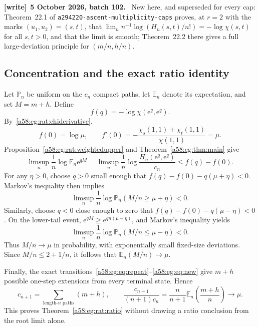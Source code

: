 \documentclass[11pt,letterpaper]{article}
\newcommand{\file}[1]{\nolinkurl{#1}}
\theoremstyle{remark}
\newcommand{\ee}{\mathrm e}
\newcommand{\muval}{\mu}
\newenvironment{writenote}[1][]{\par\smallskip\begingroup\small
 \noindent\textbf{[write]}\if\relax\detokenize{#1}\relax\else~\textbf{#1.}\fi\ }%
 {\par\endgroup\smallskip}
\begin{document}
\begin{writenote}[5 October 2026, batch 102]
New here, and superseded for every cap: Theorem~22.1 of \file{a294220-ascent-multiplicity-caps} proves, at $r=2$ with the marks $(u_1,u_2)=(s,t)$, that $\lim_n n^{-1}\log(H_n(s,t)/n!)=-\log\chi(s,t)$ for all $s,t>0$, and that the limit is smooth; Theorem~22.2 there gives a full large-deviation principle for $(m/n,h/n)$.
\end{writenote}

\subsection{Concentration and the exact ratio identity}
Let $\mathbb P_n$ be uniform on the $c_n$ compact paths, let $\mathbb E_n$ denote its expectation, and set $M=m+h$. Define
\[
 f(q)=-\log\chi(\ee^q,\ee^q).
\]
By~\eqref{a58:eg:rat:chiderivative},
\begin{equation}\label{a58:eg:rat:fprime}
 f(0)=\log\muval,\qquad
 f'(0)=-\frac{\chi_s(1,1)+\chi_t(1,1)}{\chi(1,1)}=\muval.
\end{equation}
Proposition~\ref{a58:eg:rat:weightedupper} and Theorem~\ref{a58:eg:thm:main} give
\begin{equation}\label{a58:eg:rat:mgf}
 \limsup_n\frac1n\log\mathbb E_n\ee^{qM}
 =\limsup_n\frac1n\log\frac{H_n(\ee^q,\ee^q)}{c_n}
 \le f(q)-f(0).
\end{equation}
For any $\eta>0$, choose $q>0$ small enough that
$f(q)-f(0)-q(\muval+\eta)<0$. Markov's inequality then implies
\[
 \limsup_n\frac1n\log\mathbb P_n(M/n\ge\muval+\eta)<0.
\]
Similarly, choose $q<0$ close enough to zero that
$f(q)-f(0)-q(\muval-\eta)<0$. On the lower-tail event,
$\ee^{qM}\ge\ee^{qn(\muval-\eta)}$, and Markov's inequality yields
\[
 \limsup_n\frac1n\log\mathbb P_n(M/n\le\muval-\eta)<0.
\]
Thus $M/n\to\muval$ in probability, with exponentially small fixed-size deviations. Since $M/n\le2+1/n$, it follows that
$\mathbb E_n(M/n)\to\muval$.

Finally, the exact transitions~\eqref{a58:eg:eq:repeat}--\eqref{a58:eg:eq:new} give $m+h$ possible one-step extensions from every terminal state. Hence
\begin{equation}\label{a58:eg:rat:exactextension}
 c_{n+1}=\sum_{\text{length-}n\text{ paths}}(m+h),\qquad
 \frac{c_{n+1}}{(n+1)c_n}
 =\frac n{n+1}\mathbb E_n\left(\frac{m+h}n\right)\longrightarrow\muval.
\end{equation}
This proves Theorem~\ref{a58:eg:rat:ratio} without drawing a ratio conclusion from the root limit alone.
\end{document}
